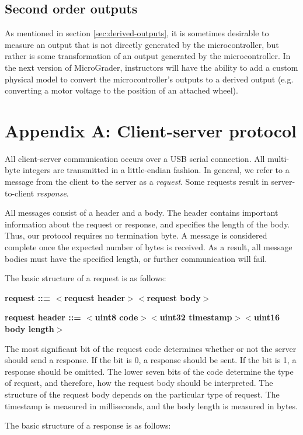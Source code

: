 \documentclass[12pt]{article}
\begin{document}
\subsection{Second order outputs}
As mentioned in section \ref{sec:derived-outputs}, it is sometimes desirable to measure an output that is not directly generated by the microcontroller, but rather is some transformation of an output generated by the microcontroller.  In the next version of MicroGrader, instructors will have the ability to add a custom physical model to convert the microcontroller's outputs to a derived output (e.g. converting a motor voltage to the position of an attached wheel).

\newpage

\section{Appendix A: Client-server protocol}
\label{sec:protocol}
All client-server communication occurs over a USB serial connection.  All multi-byte integers are transmitted in a little-endian fashion.  In general, we refer to a message from the client to the server as a \textit{request}.  Some requests result in server-to-client \textit{response}.

All messages consist of a header and a body.  The header contains important information about the request or response, and specifies the length of the body. Thus, our protocol requires no termination byte.  A message is considered complete once the expected number of bytes is received.  As a result, all message bodies must have the specified length, or further communication will fail.

The basic structure of a request is as follows:

\textbf{request ::= $<$request header$>$$<$request body$>$}

\textbf{request header ::= $<$uint8 code$>$$<$uint32 timestamp$>$$<$uint16 body length$>$}

\noindent The most significant bit of the request code determines whether or not the server should send a response.  If the bit is 0, a response should be sent.  If the bit is 1, a response should be omitted.  The lower seven bits of the code determine the type of request, and therefore, how the request body should be interpreted.  The structure of the request body depends on the particular type of request.  The timestamp is measured in milliseconds, and the body length is measured in bytes.

The basic structure of a response is as follows:
\end{document}
